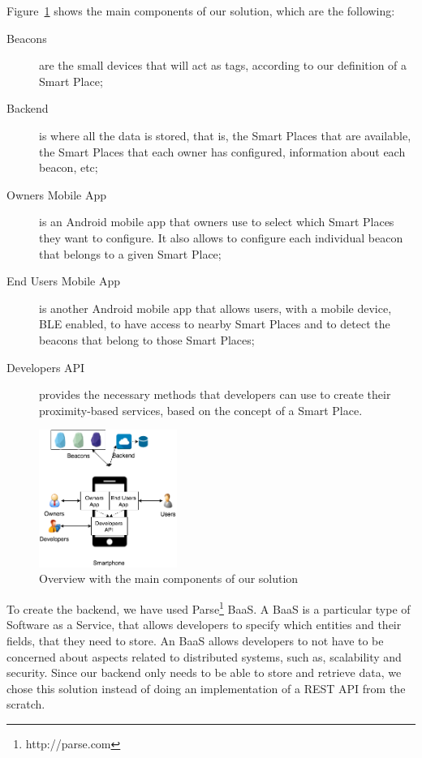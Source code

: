 Figure~\ref{fig:solution_overview} shows the main components of our solution, which are the following:
\begin{description}
  \item[Beacons]
  are the small devices that will act as tags, according to our definition of a Smart Place;
  \item[Backend]
  is where all the data is stored, that is, the Smart Places that are available, the Smart Places that each owner has configured, information about each beacon, etc;
  \item[Owners Mobile App]
  is an Android mobile app that owners use to select which Smart Places they want to configure. It also allows to configure each individual beacon that belongs to a given Smart Place;
  \item[End Users Mobile App]
  is another Android mobile app that allows users, with a mobile device, \gls{BLE} enabled, to have access to nearby Smart Places and to detect the beacons that belong to those Smart Places;
  \item[Developers \gls{API}] provides the necessary methods that developers can use to create their proximity-based services, based on the concept of a Smart Place.
\end{description}

\begin{figure}[!ht]
  \centering
    \includegraphics[width=0.4\textwidth, keepaspectratio]{figures/smart_places_solution_overview}
    \caption[Solution Overview]{Overview with the main components of our solution}
    \label{fig:solution_overview}
\end{figure}

To create the backend, we have used Parse\footnote{http://parse.com} \gls{BaaS}. A \gls{BaaS} is a particular type of Software as a Service, that allows developers to specify which entities and their fields, that they need to store.
An \gls{BaaS} allows developers to not have to be concerned about aspects related to distributed systems, such as, scalability and security.
Since our backend only needs to be able to store and retrieve data, we chose this solution instead of doing an implementation of a \gls{REST} \gls{API} from the scratch.

